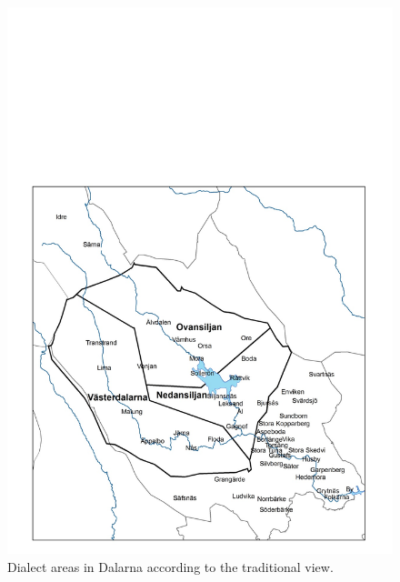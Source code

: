 \begin{figure}[h]

\includegraphics[height=.3\textheight]{figures/7_DialectAreasDalarnaTrad}
\caption{Dialect areas in Dalarna according to the traditional view.}
\label{map:6}

\end{figure}

